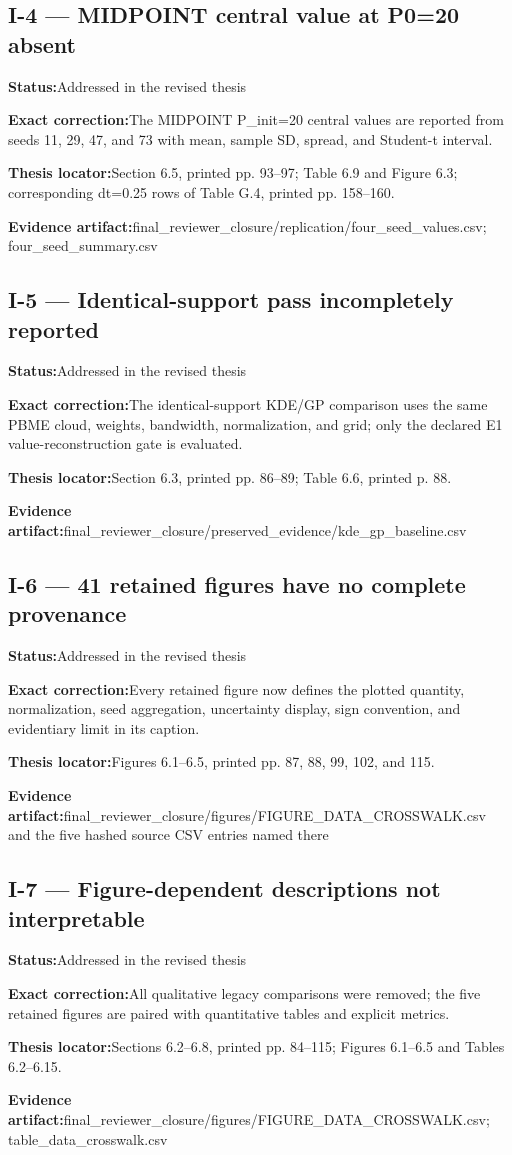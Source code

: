 \documentclass[11pt]{article}
\newcommand{\field}[2]{\textbf{#1}\quad #2\par}
\begin{document}
\subsection*{I-4 --- MIDPOINT central value at P0=20 absent}
\field{Status:}{Addressed in the revised thesis}
\field{Exact correction:}{The MIDPOINT P\_init=20 central values are reported from seeds 11, 29, 47, and 73 with mean, sample SD, spread, and Student-t interval.}
\field{Thesis locator:}{Section 6.5, printed pp. 93--97; Table 6.9 and Figure 6.3; corresponding dt=0.25 rows of Table G.4, printed pp. 158--160.}
\field{Evidence artifact:}{final\_reviewer\_closure/replication/four\_seed\_values.csv; four\_seed\_summary.csv}
\subsection*{I-5 --- Identical-support pass incompletely reported}
\field{Status:}{Addressed in the revised thesis}
\field{Exact correction:}{The identical-support KDE/GP comparison uses the same PBME cloud, weights, bandwidth, normalization, and grid; only the declared E1 value-reconstruction gate is evaluated.}
\field{Thesis locator:}{Section 6.3, printed pp. 86--89; Table 6.6, printed p. 88.}
\field{Evidence artifact:}{final\_reviewer\_closure/preserved\_evidence/kde\_gp\_baseline.csv}
\subsection*{I-6 --- 41 retained figures have no complete provenance}
\field{Status:}{Addressed in the revised thesis}
\field{Exact correction:}{Every retained figure now defines the plotted quantity, normalization, seed aggregation, uncertainty display, sign convention, and evidentiary limit in its caption.}
\field{Thesis locator:}{Figures 6.1--6.5, printed pp. 87, 88, 99, 102, and 115.}
\field{Evidence artifact:}{final\_reviewer\_closure/figures/FIGURE\_DATA\_CROSSWALK.csv and the five hashed source CSV entries named there}
\subsection*{I-7 --- Figure-dependent descriptions not interpretable}
\field{Status:}{Addressed in the revised thesis}
\field{Exact correction:}{All qualitative legacy comparisons were removed; the five retained figures are paired with quantitative tables and explicit metrics.}
\field{Thesis locator:}{Sections 6.2--6.8, printed pp. 84--115; Figures 6.1--6.5 and Tables 6.2--6.15.}
\field{Evidence artifact:}{final\_reviewer\_closure/figures/FIGURE\_DATA\_CROSSWALK.csv; table\_data\_crosswalk.csv}
\end{document}
